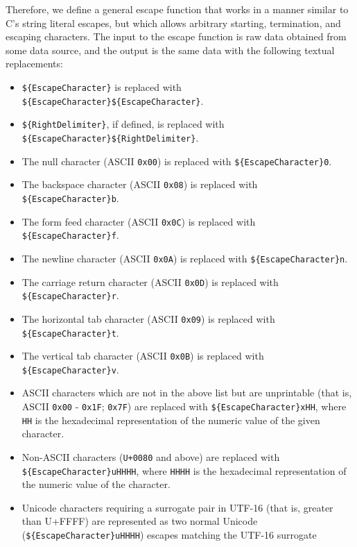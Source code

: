 \documentclass[letterpaper,12pt]{article}
\newcommand{\var}[1]{\texttt{\$\{#1\}}}
\begin{document}
\label{generalescape}
Therefore, we define a general escape function that works in a manner similar to
C's string literal escapes, but which allows arbitrary starting, termination,
and escaping characters. The input to the escape function is raw data obtained
from some data source, and the output is the same data with the following
textual replacements:

\begin{itemize}
    \item \var{EscapeCharacter} is replaced with
    \var{EscapeCharacter}\var{EscapeCharacter}.
    \item \var{RightDelimiter}, if defined,  is replaced with
    \var{EscapeCharacter}\var{RightDelimiter}.
    \item The null character (ASCII \verb|0x00|) is replaced with
    \var{EscapeCharacter}\texttt{0}.
    \item The backspace character (ASCII \verb|0x08|) is replaced with
    \var{EscapeCharacter}\texttt{b}.
    \item The form feed character (ASCII \verb|0x0C|) is replaced with
    \var{EscapeCharacter}\texttt{f}.
    \item The newline character (ASCII \verb|0x0A|) is replaced with
    \var{EscapeCharacter}\texttt{n}.
    \item The carriage return character (ASCII \verb|0x0D|) is replaced with
    \var{EscapeCharacter}\texttt{r}.
    \item The horizontal tab character (ASCII \verb|0x09|) is replaced with
    \var{EscapeCharacter}\texttt{t}.
    \item The vertical tab character (ASCII \verb|0x0B|) is replaced with
    \var{EscapeCharacter}\texttt{v}.
    \item ASCII characters which are not in the above list but are unprintable
    (that is, ASCII \verb|0x00| - \verb|0x1F|; \verb|0x7F|) are
    replaced with \var{EscapeCharacter}\texttt{xHH}, where \texttt{HH} is the
    hexadecimal representation of the numeric value of the given character.
    \item Non-ASCII characters (\verb|U+0080| and above) are replaced with
    \var{EscapeCharacter}\texttt{uHHHH}, where \texttt{HHHH} is the hexadecimal
    representation of the numeric value of the character.
    \item Unicode characters requiring a surrogate pair in UTF-16 (that is,
    greater than U+FFFF) are represented as two normal Unicode
    (\var{EscapeCharacter}\texttt{uHHHH}) escapes matching the UTF-16 surrogate

\end{itemize}
\end{document}
